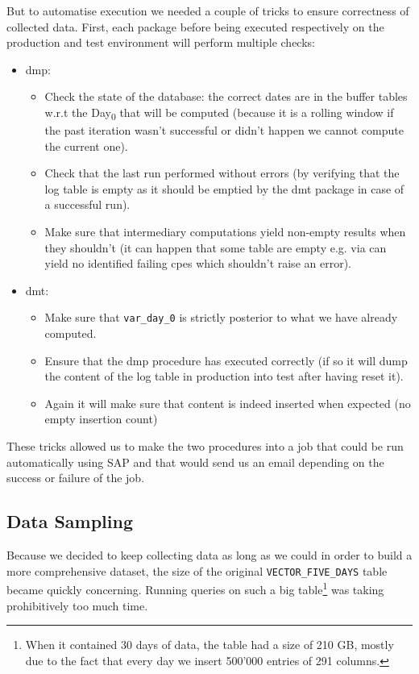 But to automatise execution we needed a couple of tricks to ensure correctness of collected data. First, each package before being executed respectively on the production and test environment will perform multiple checks:
 \begin{itemize}
	\item \acrshort{dmp}:  \begin{itemize}[noitemsep,topsep=0pt]
					\item Check the state of the database: the correct dates are in the buffer tables w.r.t the Day\textsubscript{0} that will be computed (because it is a rolling window if the past iteration wasn't successful or didn't happen we cannot compute the current one).
					\item Check that the last run performed without errors (by verifying that the log table is empty as it should be emptied by the \acrshort{dmt} package in case of a successful run).
					\item Make sure that intermediary computations yield non-empty results when they shouldn't (it can happen that some table are empty e.g. \acrshort{via} can yield no identified failing \acrshort{cpe}s which shouldn't raise an error).
				\end{itemize}
	\item \acrshort{dmt}: 	\begin{itemize}[noitemsep,topsep=0pt]
					\item Make sure that \texttt{var\_day\_0} is strictly posterior to what we have already computed.
					\item Ensure that the \acrshort{dmp} procedure has executed correctly (if so it will dump the content of the log table in production into test after having reset it).
					\item Again it will make sure that content is indeed inserted when expected (no empty insertion count)
				\end{itemize}
\end{itemize}	

These tricks allowed us to make the two procedures into a job that could be run automatically using SAP and that would send us an email depending on the success or failure of the job. 

\subsection{Data Sampling}
\label{subsec:data_sampling}

Because we decided to keep collecting data as long as we could in order to build a more comprehensive dataset, the size of the original \texttt{VECTOR\_FIVE\_DAYS} table became quickly concerning. Running queries on such a big table\footnote{When it contained 30 days of data, the table had a size of 210 GB, mostly due to the fact that every day we insert 500'000 entries of 291 columns.} was taking prohibitively too much time. 

